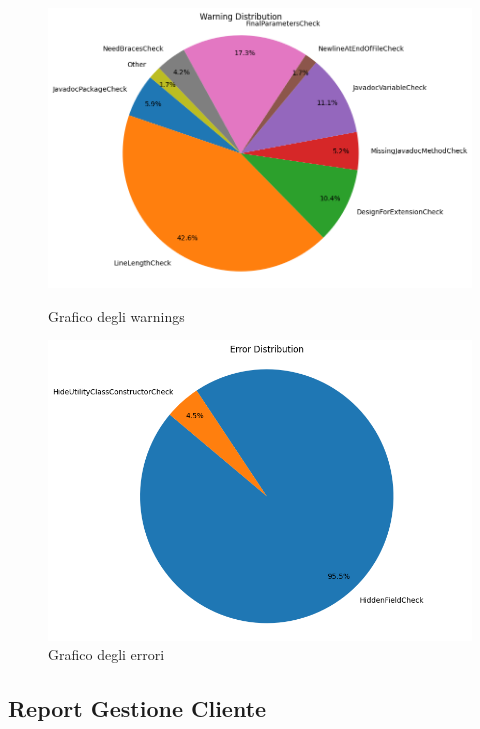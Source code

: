\begin{figure}[H]
\begin{minipage}[b]{0.45\textwidth}
		\includegraphics[width=\textwidth]{iterazione1/images/comanda-warning_severity_distribution_pie_chart.png}
		\caption{Grafico degli warnings}
		\label{fig:comanda-warning_severity_distribution_pie_chart}
	\end{minipage}
	\hfill
	\begin{minipage}[b]{0.45\textwidth}
		\centering
		\includegraphics[width=\textwidth]{iterazione1/images/comanda-error_severity_distribution_pie_chart.png}
		\caption{Grafico degli errori}
		\label{fig:comanda-error_severity_distribution_pie_chart}
	\end{minipage}
\end{figure}

\newpage

\subsection{Report Gestione Cliente}

